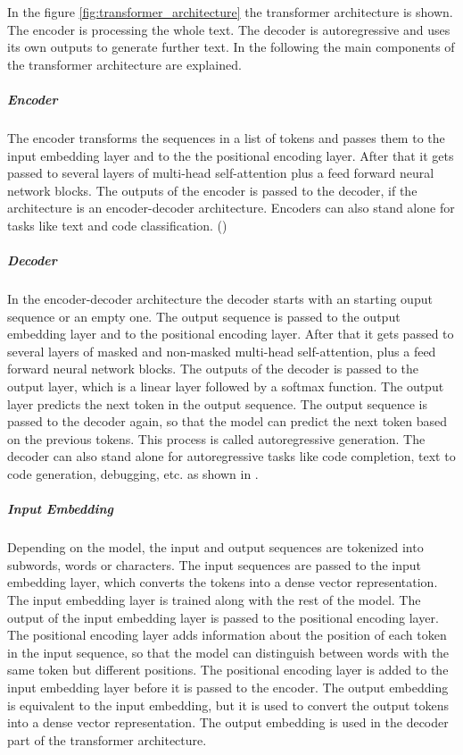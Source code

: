 In the figure \ref{fig:transformer_architecture} the transformer architecture is shown. The encoder is processing the whole text. The decoder is autoregressive and uses its own outputs to generate further text. In the following the main components of the transformer architecture are explained.

\subparagraph{Encoder}

The encoder transforms the sequences in a list of tokens and passes them to the input embedding layer and to the the positional encoding layer. After that it gets passed to several layers of multi-head self-attention plus a feed forward neural network blocks. The outputs of the encoder is passed to the decoder, if the architecture is an encoder-decoder architecture. Encoders can also stand alone for tasks like text and code classification. (\citet{Hou.8212023})

\subparagraph{Decoder}

In the encoder-decoder architecture the decoder starts with an starting ouput sequence or an empty one. The output sequence is passed to the output embedding layer and to the positional encoding layer. After that it gets passed to several layers of masked and non-masked multi-head self-attention, plus a feed forward neural network blocks. The outputs of the decoder is passed to the output layer, which is a linear layer followed by a softmax function. The output layer predicts the next token in the output sequence. The output sequence is passed to the decoder again, so that the model can predict the next token based on the previous tokens. This process is called autoregressive generation.
The decoder can also stand alone for autoregressive tasks like code completion, text to code generation, debugging, etc. as shown in \citet{Hou.8212023}.

\subparagraph{Input Embedding}
Depending on the model, the input and output sequences are tokenized into subwords, words or characters. The input sequences are passed to the input embedding layer, which converts the tokens into a dense vector representation. The input embedding layer is trained along with the rest of the model. The output of the input embedding layer is passed to the positional encoding layer. The positional encoding layer adds information about the position of each token in the input sequence, so that the model can distinguish between words with the same token but different positions. The positional encoding layer is added to the input embedding layer before it is passed to the encoder. The output embedding is equivalent to the input embedding, but it is used to convert the output tokens into a dense vector representation. The output embedding is used in the decoder part of the transformer architecture.

